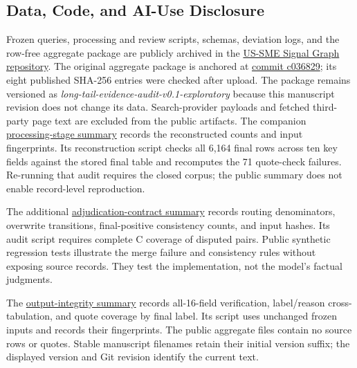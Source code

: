 \documentclass[10pt]{article}
\begin{document}
\hypertarget{data-code-and-ai-use-disclosure}{%
\subsection{Data, Code, and AI-Use Disclosure}\label{data-code-and-ai-use-disclosure}}

Frozen queries, processing and review scripts, schemas, deviation logs, and the row-free aggregate package are publicly archived in the \href{https://github.com/elijahqi/us-sme-signal-graph}{US-SME Signal Graph repository}. The original aggregate package is anchored at \href{https://github.com/elijahqi/us-sme-signal-graph/commit/c036829224cbd600534623e7f751cd86514dbd1d}{commit c036829}; its eight published SHA-256 entries were checked after upload. The package remains versioned as \emph{long-tail-evidence-audit-v0.1-exploratory} because this manuscript revision does not change its data. Search-provider payloads and fetched third-party page text are excluded from the public artifacts. The companion \href{https://github.com/elijahqi/us-sme-signal-graph/blob/main/paper/audit_processing_sensitivity_v0_2.json}{processing-stage summary} records the reconstructed counts and input fingerprints. Its reconstruction script checks all 6,164 final rows across ten key fields against the stored final table and recomputes the 71 quote-check failures. Re-running that audit requires the closed corpus; the public summary does not enable record-level reproduction.

The additional \href{https://github.com/elijahqi/us-sme-signal-graph/blob/main/paper/adjudication_contracts_v0_3.json}{adjudication-contract summary} records routing denominators, overwrite transitions, final-positive consistency counts, and input hashes. Its audit script requires complete C coverage of disputed pairs. Public synthetic regression tests illustrate the merge failure and consistency rules without exposing source records. They test the implementation, not the model's factual judgments.

The \href{https://github.com/elijahqi/us-sme-signal-graph/blob/main/paper/output_integrity_v0_4.json}{output-integrity summary} records all-16-field verification, label/reason cross-tabulation, and quote coverage by final label. Its script uses unchanged frozen inputs and records their fingerprints. The public aggregate files contain no source rows or quotes. Stable manuscript filenames retain their initial version suffix; the displayed version and Git revision identify the current text.
\end{document}
